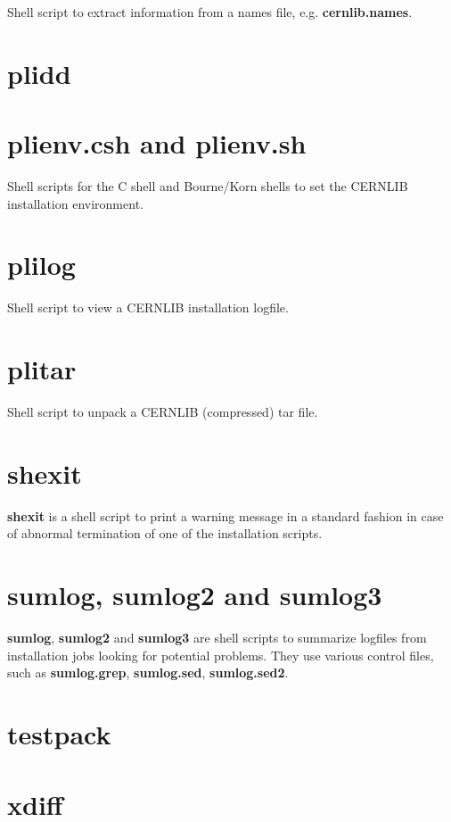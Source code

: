 Shell script to extract information from a names file, e.g. {\bf cernlib.names}.

\section{plidd}

\section{plienv.csh and plienv.sh}

Shell scripts for the C shell and Bourne/Korn shells to set the CERNLIB
installation environment.

\section{plilog}

Shell script to view a CERNLIB installation logfile.

\section{plitar}

Shell script to unpack a CERNLIB (compressed) tar file.

\section{shexit}

{\bf shexit} is a shell script to print a warning message in a standard
fashion in case of abnormal termination of one of the installation scripts.

\section{sumlog, sumlog2 and sumlog3}

{\bf sumlog}, {\bf sumlog2} and {\bf sumlog3} are shell scripts to summarize 
logfiles from installation
jobs looking for potential problems. They use various control files, such as
{\bf sumlog.grep}, {\bf sumlog.sed}, {\bf sumlog.sed2}.

\section{testpack}

\section{xdiff}


